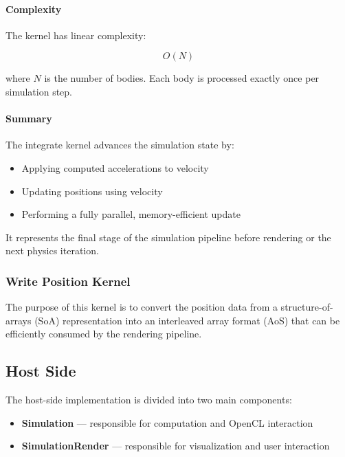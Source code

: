 \documentclass[12pt]{article}
\begin{document}
\paragraph{Complexity}

The kernel has linear complexity:

\[
O(N)
\]

where \(N\) is the number of bodies. Each body is processed exactly once per simulation step.

\paragraph{Summary}

The integrate kernel advances the simulation state by:

\begin{itemize}
    \item Applying computed accelerations to velocity
    \item Updating positions using velocity
    \item Performing a fully parallel, memory-efficient update
\end{itemize}

It represents the final stage of the simulation pipeline before rendering or the next physics iteration.

\subsubsection{Write Position Kernel}

The purpose of this kernel is to convert the position data from a structure-of-arrays
(SoA) representation into an interleaved array format (AoS) that can be efficiently
consumed by the rendering pipeline.

\subsection{Host Side}

The host-side implementation is divided into two main components:

\begin{itemize}
    \item \textbf{Simulation} — responsible for computation and OpenCL interaction
    \item \textbf{SimulationRender} — responsible for visualization and user interaction
\end{itemize}
\end{document}
